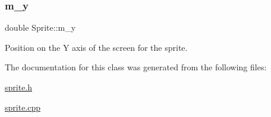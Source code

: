 \subsubsection{\texorpdfstring{m\+\_\+y}{m\_y}}
{\footnotesize\ttfamily double Sprite\+::m\+\_\+y\hspace{0.3cm}{\ttfamily [protected]}}



Position on the Y axis of the screen for the sprite. 



The documentation for this class was generated from the following files\+:\begin{DoxyCompactItemize}
\item 
\hyperlink{sprite_8h}{sprite.\+h}\item 
\hyperlink{sprite_8cpp}{sprite.\+cpp}\end{DoxyCompactItemize}

